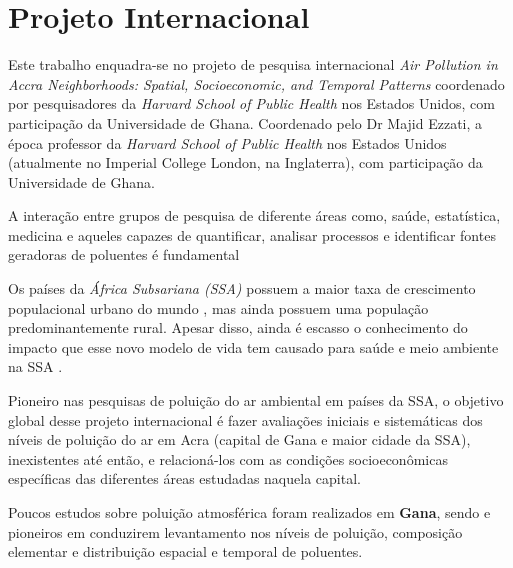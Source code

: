 \section{Projeto Internacional}

Este trabalho enquadra-se no projeto de pesquisa internacional 
\textit{Air Pollution in Accra Neighborhoods: Spatial, Socioeconomic, and Temporal Patterns} 
coordenado por pesquisadores da \textit{Harvard School of Public Health} nos Estados Unidos, 
com participação da Universidade de Ghana. 
Coordenado pelo Dr Majid Ezzati, a época professor da \textit{Harvard School of Public Health} 
nos Estados Unidos (atualmente no Imperial College London, na Inglaterra), com participação 
da Universidade de Ghana. 

A interação entre grupos de pesquisa de diferente áreas como, saúde, estatística,
medicina e aqueles capazes de quantificar, analisar processos e 
identificar fontes geradoras de poluentes é fundamental

Os países da \textit{África Subsariana (SSA)} possuem a maior taxa de crescimento 
populacional urbano do mundo \cite{united2006world}, mas ainda possuem uma população 
predominantemente rural. 
Apesar disso, ainda é escasso o conhecimento do impacto que esse novo modelo de vida 
tem causado para saúde e meio ambiente na SSA \cite{cohen2004urban}. 

Pioneiro nas pesquisas de poluição do ar ambiental em países da SSA, o objetivo 
global desse projeto internacional é fazer avaliações iniciais e sistemáticas 
dos níveis de poluição do ar em Acra (capital de Gana e maior cidade da SSA), 
inexistentes até então, e relacioná-los com as condições socioeconômicas 
específicas das diferentes áreas estudadas naquela capital.

Poucos estudos sobre poluição atmosférica foram realizados em \textbf{Gana}, 
sendo \citep{ARKU2008} e \citep{DIONISIO2010} pioneiros em conduzirem 
levantamento nos níveis de poluição, composição elementar e distribuição espacial 
e temporal de poluentes. 



